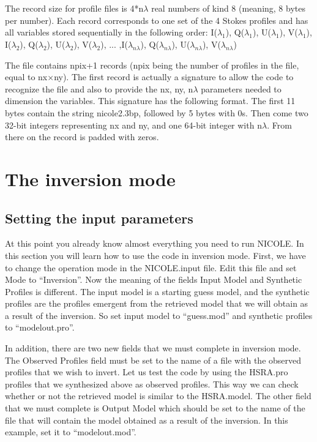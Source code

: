 The record size for profile files is 4*n$\lambda$ real numbers of kind 8
(meaning, 8 bytes per number). Each record corresponds to one set of
the 4 Stokes profiles and has all variables stored sequentially in the
following order: I($\lambda_1$), Q($\lambda_1$), U($\lambda_1$),
V($\lambda_1$), I($\lambda_2$), Q($\lambda_2$), U($\lambda_2$),
V($\lambda_2$), ... ,I($\lambda_{n\lambda}$), Q($\lambda_{n\lambda}$),
U($\lambda_{n\lambda}$), V($\lambda_{n\lambda}$)

The file contains npix+1 records (npix being the number of profiles in
the file, equal to nx$\times$ny). The first record is actually a
signature to allow the code to recognize the file and also to provide
the nx, ny, n$\lambda$ parameters needed to dimension the
variables. This signature has the following format. The first 11 bytes
contain the string nicole2.3bp, followed by 5 bytes with 0s. Then come
two 32-bit integers representing nx and ny, and one 64-bit integer
with n$\lambda$. From there on the record is padded with zeros.


\section{The inversion mode}
\label{invmode}

\subsection{Setting the input parameters}

At this point you already know almost everything you need to run
NICOLE. In this section you will learn how to use the code in
inversion mode. First, we have to change the operation mode in the
NICOLE.input file. Edit this file and set Mode to ``Inversion''. Now
the meaning of the fields Input Model and Synthetic Profiles is
different. The input model is a starting guess model, and the
synthetic profiles are the profiles emergent from the retrieved model
that we will obtain as a result of the inversion. So set input model
to ``guess.mod'' and synthetic profiles to ``modelout.pro''.

In addition, there are two new fields that we must complete in
inversion mode. The Observed Profiles field must be set to the name of
a file with the observed profiles that we wish to invert. Let us test
the code by using the HSRA.pro profiles that we synthesized above as
observed profiles. This way we can check whether or not the retrieved
model is similar to the HSRA.model. The other field that we must
complete is Output Model which should be set to the name of the file
that will contain the model obtained as a result of the inversion. In
this example, set it to ``modelout.mod''.



